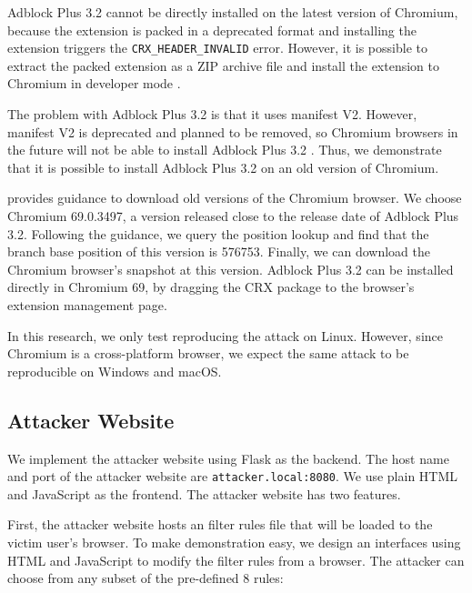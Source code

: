 \documentclass[conference]{IEEEtran}
\begin{document}
Adblock Plus 3.2 cannot be directly installed on the latest version of Chromium, because the extension is packed in a deprecated format and installing the extension triggers the \lstinline{CRX_HEADER_INVALID} error. However, it is possible to extract the packed extension as a ZIP archive file and install the extension to Chromium in developer mode \cite{stackoverflow_crx_header_invalid}.

The problem with Adblock Plus 3.2 is that it uses manifest V2. However, manifest V2 is deprecated and planned to be removed, so Chromium browsers in the future will not be able to install Adblock Plus 3.2 \cite{chrome_manifest_v2}. Thus, we demonstrate that it is possible to install Adblock Plus 3.2 on an old version of Chromium.

\cite{chromium_old_download} provides guidance to download old versions of the Chromium browser. We choose Chromium 69.0.3497, a version released close to the release date of Adblock Plus 3.2.
Following the guidance, we query the position lookup and find that the branch base position of this version is 576753. Finally, we can download the Chromium browser's snapshot at this version. Adblock Plus 3.2 can be installed directly in Chromium 69, by dragging the CRX package to the browser's extension management page.

In this research, we only test reproducing the attack on Linux. However, since Chromium is a cross-platform browser, we expect the same attack to be reproducible on Windows and macOS.

\subsection{Attacker Website}

We implement the attacker website using Flask as the backend. The host name and port of the attacker website are \lstinline{attacker.local:8080}. We use plain HTML and JavaScript as the frontend. The attacker website has two features.

First, the attacker website hosts an filter rules file that will be loaded to the victim user's browser. To make demonstration easy, we design an interfaces using HTML and JavaScript to modify the filter rules from a browser. The attacker can choose from any subset of the pre-defined 8 rules:
\end{document}
